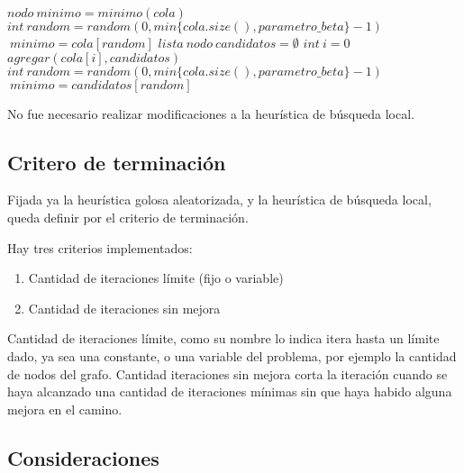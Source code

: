 \begin{algorithmic}

    	 \State $nodo \: minimo = minimo(cola)$    
		\State $int \: random = random(0, min\{cola.size(), parametro\_beta\} -1)$
		\State $ \: minimo = cola[random]$
		\State $lista \: nodo \: candidatos = \emptyset$
		\State $int \: i = 0$
				\State $ agregar(cola[i], candidatos) $
			\EndIf
		\EndWhile
		\State $int \: random = random(0, min\{cola.size(), parametro\_beta\} -1)$
		\State $ \: minimo = candidatos[random]$
		\EndIf
		
\EndWhile
\end{algorithmic}

\vspace{2mm}

No fue necesario realizar modificaciones a la heur\'istica de b\'usqueda local.

\subsection{Critero de terminaci\'on}

Fijada ya la heur\'istica golosa aleatorizada, y la heur\'istica de b\'usqueda local, queda definir por el criterio de terminaci\'on.


\vspace{2mm}

Hay tres criterios implementados:

\begin{enumerate}
\item Cantidad de iteraciones l\'imite (fijo o variable)
\item Cantidad de iteraciones sin mejora
\end{enumerate}

Cantidad de iteraciones l\'imite, como su nombre lo indica itera hasta un l\'imite dado, ya sea una constante, o una variable del problema, por ejemplo la cantidad de nodos del grafo. Cantidad iteraciones sin mejora corta la iteraci\'on cuando se haya alcanzado una cantidad de iteraciones m\'inimas sin que haya habido alguna mejora en el camino.

\vspace{2mm}

\subsection{Consideraciones}

